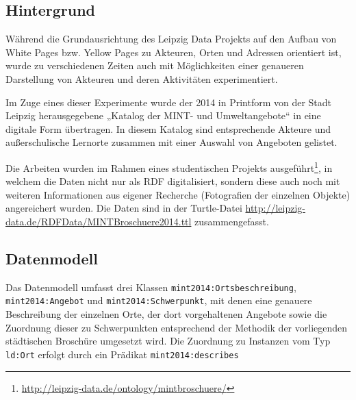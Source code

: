 \documentclass[a4paper,11pt]{article}
\begin{document}
\subsection{Hintergrund}
Während die Grundausrichtung des Leipzig Data Projekts auf den Aufbau von White
Pages bzw. Yellow Pages zu Akteuren, Orten und Adressen orientiert ist, wurde
zu verschiedenen Zeiten auch mit Möglichkeiten einer genaueren Darstellung von
Akteuren und deren Aktivitäten experimentiert.

Im Zuge eines dieser Experimente wurde der 2014 in Printform von der Stadt
Leipzig herausgegebene „Katalog der MINT- und Umweltangebote“ in eine digitale
Form übertragen. In diesem Katalog sind entsprechende Akteure und
außerschulische Lernorte zusammen mit einer Auswahl von Angeboten gelistet.

Die Arbeiten wurden im Rahmen eines studentischen Projekts
ausgeführt\footnote{\url{http://leipzig-data.de/ontology/mintbroschuere/}}, in
welchem die Daten nicht nur als RDF digitalisiert, sondern diese auch noch mit
weiteren Informationen aus eigener Recherche (Fotografien der einzelnen
Objekte) angereichert wurden. Die Daten sind in der Turtle-Datei
\url{http://leipzig-data.de/RDFData/MINTBroschuere2014.ttl} zusammengefasst.

\subsection{Datenmodell}

Das Datenmodell umfasst drei Klassen \texttt{mint2014:Ortsbeschreibung},
\texttt{mint2014:Angebot} und \texttt{mint2014:Schwerpunkt}, mit denen eine
genauere Beschreibung der einzelnen Orte, der dort vorgehaltenen Angebote sowie
die Zuordnung dieser zu Schwerpunkten entsprechend der Methodik der
vorliegenden städtischen Broschüre umgesetzt wird.  Die Zuordnung zu Instanzen
vom Typ \texttt{ld:Ort} erfolgt durch ein Prädikat \texttt{mint2014:describes}
\end{document}
